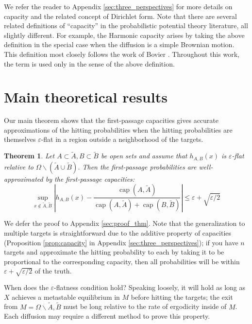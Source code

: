 \documentclass[12pt, nofootinbib,english, amsmath, amssymb, aps, priprint, graphicx,floatfix]{revtex4-1}
\newtheorem{theorem}{Theorem}
\theoremstyle{plain}
\theoremstyle{definition}
\theoremstyle{plain}
\newcommand{\capac}[2]{\ensuremath{\operatorname{cap}}(#1,#2)}
\begin{document}
We refer the reader to Appendix \ref{sec:three_perspectives} for more details on capacity and the related concept of Dirichlet form.  Note that there are several related definitions of ``capacity'' in the probabilistic potential theory literature, all slightly different.  For example, the Harmonic capacity arises by taking the above definition in the special case when the diffusion is a simple Brownian motion.  This definition most closely follows the work of Bovier \cite{Bovier2016-ez,Bovier2004-wj}.  Throughout this work, the term is used only in the sense of the above definition. 

\section{Main theoretical results}
\label{sec:MainResults}

Our main theorem shows that the first-passage capacities gives accurate approximations of the hitting probabilities when the hitting probabilities are themselves $\varepsilon$-flat in a region outside a neighborhood of the targets.

\begin{theorem}\label{thm:main_thm}  
Let $A\subset \tilde A,B\subset \tilde B$ be open sets and assume that  $h_{A,B}(x)$ is $\varepsilon$-flat relative to 
$\Omega \backslash (\tilde A \cup \tilde B)$.
Then the first-passage probabilities are well-approximated by the first-passage capacities:
\[ \sup_{x \notin \tilde A,\tilde B} \left| h_{A,B} (x) - \frac{\capac{A}{\tilde A}}{\capac{A}{\tilde A}+\capac{B}{\tilde B}} \right| \leqslant \varepsilon + \sqrt{\varepsilon/2} \]
\end{theorem}

We defer the proof to Appendix \ref{sec:proof_thm}.  Note that the generalization to multiple targets is straightforward due to the additive property of capacities (Proposition \ref{prop:capacity} in Appendix \ref{sec:three_perspectives}); if you have $n$ targets and approximate the hitting probability to each by taking it to be proportional to the corresponding capacity, then all probabilities will be within $\varepsilon+\sqrt{\varepsilon/2}$ of the truth.

When does the $\varepsilon$-flatness condition hold?  Speaking loosely, it will hold as long as $X$ achieves a metastable equilibrium in $M$ before hitting the targets; the exit from  $M = \Omega \backslash \tilde A,\tilde B$ must be long relative to the rate of ergodicity inside of $M$.  Each diffusion may require a different method to prove this property.  
\end{document}
